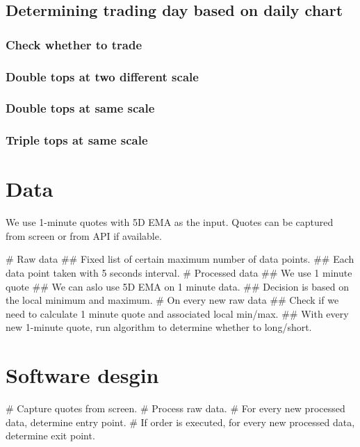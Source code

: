 \subsection{Determining trading day based on daily chart}
\subsubsection{Check whether to trade}

\subsubsection{Double tops at two different scale}
\subsubsection{Double tops at same scale}
\subsubsection{Triple tops at same scale}


\section{Data}
We use 1-minute quotes with 5D EMA as the input. Quotes can be captured from screen or from API if available. 

\begin{listb}
# Raw data
## Fixed list of certain maximum number of data points. 
## Each data point taken with 5 seconds interval. 
# Processed data
## We use 1 minute quote 
## We can aslo use 5D EMA on 1 minute data.
## Decision is based on the local minimum and maximum.
# On every new raw data
## Check if we need to calculate 1 minute quote and associated local min/max. 
## With every new 1-minute quote, run algorithm to determine whether to long/short. 
\end{listb}

\section{Software desgin}
\begin{listb}
# Capture quotes from screen. 
# Process raw data.
# For every new processed data, determine entry point.
# If order is executed, for every new processed data, determine exit point. 
\end{listb}

